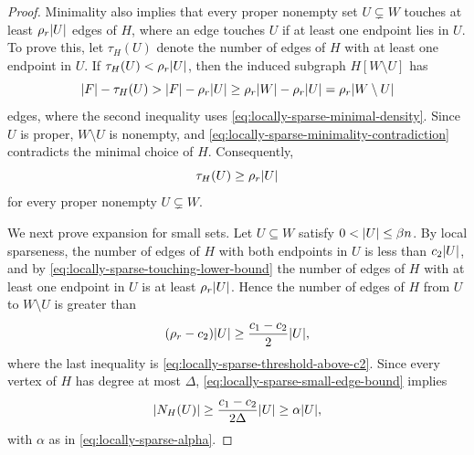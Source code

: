 \begin{proof}
	Minimality also implies that every proper nonempty set \(U\subsetneq W\) touches at least \(\rho_r\lvert U\rvert\) edges of \(H\), where an edge touches \(U\) if at least one endpoint lies in \(U\). To prove this, let \(\tau_H(U)\) denote the number of edges of \(H\) with at least one endpoint in \(U\). If \(\tau_H(U)<\rho_r\lvert U\rvert\), then the induced subgraph \(H[W\setminus U]\) has
	\begin{equation}
		\label{eq:locally-sparse-minimality-contradiction}
		\lvert F\rvert-\tau_H(U)>\lvert F\rvert-\rho_r\lvert U\rvert\geq \rho_r\lvert W\rvert-\rho_r\lvert U\rvert=\rho_r\lvert W\setminus U\rvert
	\end{equation}
	edges, where the second inequality uses \cref{eq:locally-sparse-minimal-density}. Since \(U\) is proper, \(W\setminus U\) is nonempty, and \cref{eq:locally-sparse-minimality-contradiction} contradicts the minimal choice of \(H\). Consequently,
	\begin{equation}
		\label{eq:locally-sparse-touching-lower-bound}
		\tau_H(U)\geq \rho_r\lvert U\rvert
	\end{equation}
	for every proper nonempty \(U\subsetneq W\).

	We next prove expansion for small sets. Let \(U\subseteq W\) satisfy \(0<\lvert U\rvert\leq \beta n\). By local sparseness, the number of edges of \(H\) with both endpoints in \(U\) is less than \(c_2\lvert U\rvert\), and by \cref{eq:locally-sparse-touching-lower-bound} the number of edges of \(H\) with at least one endpoint in \(U\) is at least \(\rho_r\lvert U\rvert\). Hence the number of edges of \(H\) from \(U\) to \(W\setminus U\) is greater than
	\begin{equation}
		\label{eq:locally-sparse-small-edge-bound}
		(\rho_r-c_2)\lvert U\rvert\geq \frac{c_1-c_2}{2}\lvert U\rvert,
	\end{equation}
	where the last inequality is \cref{eq:locally-sparse-threshold-above-c2}. Since every vertex of \(H\) has degree at most \(\Delta\), \cref{eq:locally-sparse-small-edge-bound} implies
	\begin{equation}
		\label{eq:locally-sparse-small-neighbor-bound}
		\lvert N_H(U)\rvert\geq \frac{c_1-c_2}{2\Delta}\lvert U\rvert\geq \alpha\lvert U\rvert,
	\end{equation}
	with \(\alpha\) as in \cref{eq:locally-sparse-alpha}.


\end{proof}

